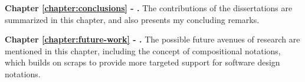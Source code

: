 \textbf{Chapter \ref{chapter:conclusions} - .} The contributions of the dissertations are summarized in this chapter, and also presents my concluding remarks.

\textbf{Chapter \ref{chapter:future-work} - .} The possible future avenues of research are mentioned in this chapter, including the concept of compositional notations, which builds on scraps to provide more targeted support for software design notations.

